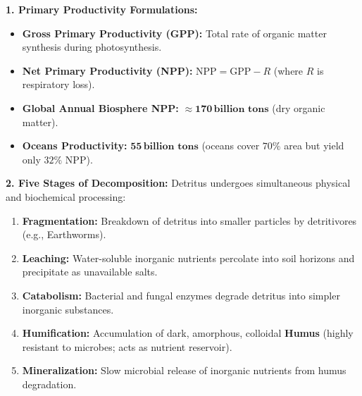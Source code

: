 \documentclass[10pt,twoside,openright]{book}
\begin{document}
\begin{formulabox}
\textbf{1. Primary Productivity Formulations:}
\begin{itemize}[leftmargin=*]
  \item \textbf{Gross Primary Productivity (GPP):} Total rate of organic matter synthesis during photosynthesis.
  \item \textbf{Net Primary Productivity (NPP):} $\mathrm{NPP} = \mathrm{GPP} - R$ (where $R$ is respiratory loss).
  \item \textbf{Global Annual Biosphere NPP:} $\approx \mathbf{170\,\text{billion tons}}$ (dry organic matter).
  \item \textbf{Oceans Productivity:} $\mathbf{55\,\text{billion tons}}$ (oceans cover $70\%$ area but yield only $32\%$ NPP).
\end{itemize}

\textbf{2. Five Stages of Decomposition:}
Detritus undergoes simultaneous physical and biochemical processing:
\begin{enumerate}
  \item \textbf{Fragmentation:} Breakdown of detritus into smaller particles by detritivores (e.g., Earthworms).
  \item \textbf{Leaching:} Water-soluble inorganic nutrients percolate into soil horizons and precipitate as unavailable salts.
  \item \textbf{Catabolism:} Bacterial and fungal enzymes degrade detritus into simpler inorganic substances.
  \item \textbf{Humification:} Accumulation of dark, amorphous, colloidal \textbf{Humus} (highly resistant to microbes; acts as nutrient reservoir).
  \item \textbf{Mineralization:} Slow microbial release of inorganic nutrients from humus degradation.
\end{enumerate}


\end{formulabox}
\end{document}
